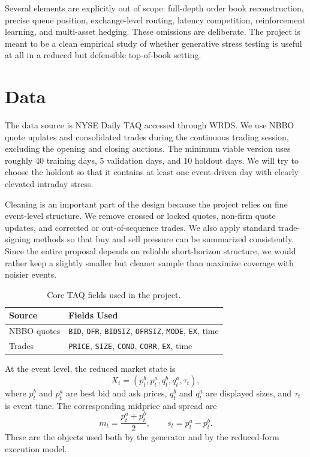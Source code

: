 \documentclass[10pt,letterpaper,twocolumn]{article}
\begin{document}
Several elements are explicitly out of scope: full-depth order book reconstruction, precise queue position, exchange-level routing, latency competition, reinforcement learning, and multi-asset hedging. These omissions are deliberate. The project is meant to be a clean empirical study of whether generative stress testing is useful at all in a reduced but defensible top-of-book setting.

\section{Data}

The data source is NYSE Daily TAQ accessed through WRDS. We use NBBO quote updates and consolidated trades during the continuous trading session, excluding the opening and closing auctions. The minimum viable version uses roughly 40 training days, 5 validation days, and 10 holdout days. We will try to choose the holdout so that it contains at least one event-driven day with clearly elevated intraday stress.

Cleaning is an important part of the design because the project relies on fine event-level structure. We remove crossed or locked quotes, non-firm quote updates, and corrected or out-of-sequence trades. We also apply standard trade-signing methods so that buy and sell pressure can be summarized consistently. Since the entire proposal depends on reliable short-horizon structure, we would rather keep a slightly smaller but cleaner sample than maximize coverage with noisier events.

\begin{table}[h]
\centering
\small
\begin{tabularx}{\columnwidth}{@{}lY@{}}
\toprule
\textbf{Source} & \textbf{Fields Used} \\
\midrule
NBBO quotes & \texttt{BID}, \texttt{OFR}, \texttt{BIDSIZ}, \texttt{OFRSIZ}, \texttt{MODE}, \texttt{EX}, time \\
Trades & \texttt{PRICE}, \texttt{SIZE}, \texttt{COND}, \texttt{CORR}, \texttt{EX}, time \\
\bottomrule
\end{tabularx}
\caption{Core TAQ fields used in the project.}
\label{tab:datafields}
\end{table}

At the event level, the reduced market state is
\[
X_t=(p_t^b,p_t^a,q_t^b,q_t^a,\tau_t),
\]
where $p_t^b$ and $p_t^a$ are best bid and ask prices, $q_t^b$ and $q_t^a$ are displayed sizes, and $\tau_t$ is event time. The corresponding midprice and spread are
\[
m_t=\frac{p_t^a+p_t^b}{2},
\qquad
s_t=p_t^a-p_t^b.
\]
These are the objects used both by the generator and by the reduced-form execution model.
\end{document}
